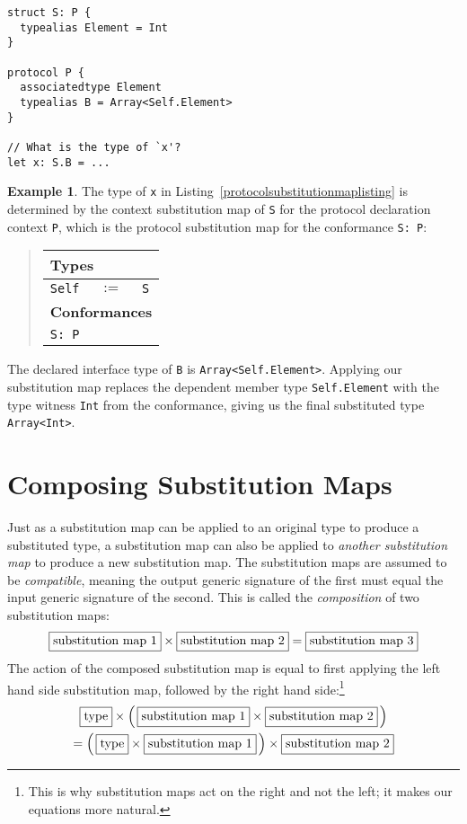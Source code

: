 \documentclass[a4paper,headsepline,bibliography=totoc,toc=flat,fleqn,twoside=semi]{scrbook}
\theoremstyle{definition}
\theoremstyle{definition}
\newtheorem{example}{Example}[chapter]
\theoremstyle{definition}
\newcommand{\mathboxed}[1]{\boxed{\mbox{\vphantom{pI\texttt{pI}}#1}}}
\newcommand{\SubMapC}[2]{\begin{tabular}{|lll|}
\hline
\multicolumn{3}{|l|}{\textbf{Types}}\\
\hline
#1\\
\hline
\hline
\multicolumn{3}{|l|}{\textbf{Conformances}}\\
\hline
#2\\
\hline
\end{tabular}}
\newcommand{\SubType}[2]{\texttt{#1}&$:=$&\texttt{#2}}
\newcommand{\SubConf}[1]{\multicolumn{3}{|l|}{\texttt{#1}}}
\begin{document}
\begin{listing}\label{protocolsubstitutionmaplisting}
\begin{Verbatim}
struct S: P {
  typealias Element = Int
}

protocol P {
  associatedtype Element
  typealias B = Array<Self.Element>
}

// What is the type of `x'?
let x: S.B = ...
\end{Verbatim}
\end{listing}
\begin{example} The type of \texttt{x} in Listing~\ref{protocolsubstitutionmaplisting} is determined by the context substitution map of \texttt{S} for the protocol declaration context \texttt{P}, which is the protocol substitution map for the conformance \texttt{S:~P}:
\begin{quote}
\SubMapC{
\SubType{Self}{S}
}{
\SubConf{S:~P}
}
\end{quote}
The declared interface type of \texttt{B} is \texttt{Array<Self.Element>}. Applying our substitution map replaces the dependent member type \texttt{Self.Element} with the type witness \texttt{Int} from the conformance, giving us the final substituted type \texttt{Array<Int>}.
\end{example}

\section{Composing Substitution Maps}\label{submapcomposition}

Just as a substitution map can be applied to an original type to produce a substituted type, a substitution map can also be applied to \emph{another substitution map} to produce a new substitution map. The substitution maps are assumed to be \emph{compatible}, meaning the output generic signature of the first must equal the input generic signature of the second. This is called the \emph{composition} of two substitution maps:
\[\mathboxed{substitution map 1}\times \mathboxed{substitution map 2} = \mathboxed{substitution map 3}\]
The action of the composed substitution map is equal to first applying the left hand side substitution map, followed by the right hand side:\footnote{This is why substitution maps act on the right and not the left; it makes our equations more natural.}
\begin{multline*}
\mathboxed{type}\times \left(\,\mathboxed{substitution map 1} \times \mathboxed{substitution map 2}\,\right)\\
= \left(\,\mathboxed{type}\times \mathboxed{substitution map 1}\,\right)\times \mathboxed{substitution map 2}
\end{multline*}
\end{document}
